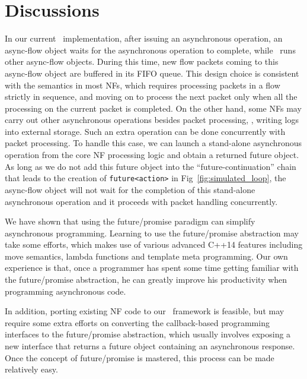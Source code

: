 \section{Discussions}

In our current \netstar~implementation, after issuing an asynchronous operation, an async-flow object waits for the asynchronous operation to complete, while \netstar~runs other async-flow objects. During this time, new flow packets coming to this async-flow object are buffered in its FIFO queue. This design choice is consistent with the semantics in most NFs, which requires processing packets in a flow strictly in sequence, and moving on to process the next packet only when all the processing on the current packet is completed. On the other hand, some NFs may carry out other asynchronous operations besides packet processing, \eg, writing logs into external storage. Such an extra operation can be done concurrently with packet processing. To handle this case,
we can launch a stand-alone asynchronous operation from the core NF processing logic and obtain a returned future object. As long as we do not add this future object into the ``future-continuation'' chain that leads to the creation of \lstinline[style=InlineStyle]{future<action>} in Fig~\ref{fig:simulated_loop}, the async-flow object will not wait for the completion of this stand-alone asynchronous operation and it proceeds with packet handling concurrently.


We have shown that using the future/promise paradigm can simplify asynchronous programming. Learning to use the future/promise abstraction may take some efforts, which makes use of various advanced C++14 features including move semantics, lambda functions and template meta programming. Our own experience is that, once a programmer has spent some time getting familiar with the future/promise abstraction, he can greatly improve his productivity when programming asynchronous code.

In addition, porting existing NF code to our \netstar~framework is feasible, but may require some extra efforts on converting the callback-based programming interfaces to the future/promise abstraction, which usually involves exposing a new interface that returns a future object containing an asynchronous response. Once  the concept of future/promise is mastered, this process can be made relatively easy.

